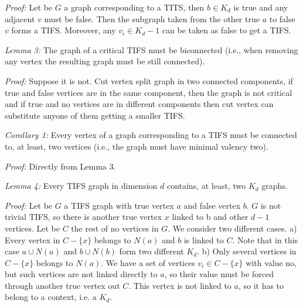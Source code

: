 \documentclass[%
  twocolumn,
 showpacs,
 showkeys,
 preprintnumbers,
 amsmath,amssymb,
 aps,
  pra,
  longbibliography,
 floatfix,
 ]{revtex4-1}
\def\endproof{ }
\begin{document}

{\em Proof:} Let be $G$ a graph corresponding to a TITS, then $b \in K_d$ is true and any adjacent $v$ must be false. Then the subgraph taken from the other true $a$ to false $v$ forms a TIFS. Moreover, any $v_i \in K_d-1$ can be taken as false to get a TIFS. \endproof


{\em Lemma 3:} The graph of a critical TIFS must be biconnected (i.e., when removing any vertex the resulting graph must be still connected).


{\em Proof:} Suppose it is not. Cut vertex split graph in two connected components, if true and false vertices are in the same component, then the graph is not critical and if true and no vertices are in different components then cut vertex can substitute anyone of them getting a smaller TIFS. \endproof


{\em Corollary 1:} Every vertex of a graph corresponding to a TIFS must be connected to, at least, two vertices (i.e., the graph must have minimal valency two).


{\em Proof:} Directly from Lemma 3. \endproof


{\em Lemma 4:} Every TIFS graph in dimension $d$ contains, at least, two $K_d$ graphs.


{\em Proof:} Let be $G$ a TIFS graph with true vertex $a$ and false vertex $b$. $G$ is not trivial TIFS, so there is another true vertex $x$ linked to b and other $d-1$ vertices. Let be $C$ the rest of no vertices in $G$. We consider two different cases. a) Every vertex in $C-\{x\}$ belongs to $N(a)$ and $b$ is linked to $C$. Note that in this case $a \cup N(a)$ and $b \cup N(b)$ form two different $K_d$. b) Only several vertices in $C-\{x\}$ belongs to $N(a)$. We have a set of vertices $v_i \in C-\{x\}$ with value no, but such vertices are not linked directly to $a$, so their value must be forced through another true vertex out $C$. This vertex is not linked to $a$, so it has to belong to a context, i.e. a $K_d$. \endproof
\end{document}
